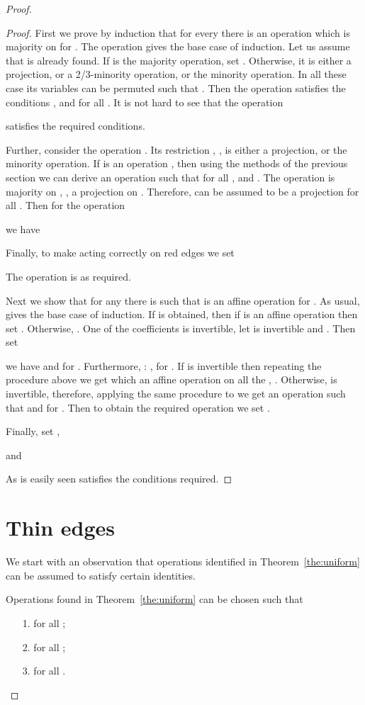 \documentclass[11pt]{article}
\begin{document}
\begin{proof}
\begin{proof}
First we prove by induction that for every  there is an
operation  which is majority on  for . The
operation  gives the base case of induction. Let us assume
that  is already found. If  is the majority
operation, set . Otherwise, it is either a projection, or
a 2/3-minority operation, or the minority operation. In all these case
its variables can be permuted such that
. Then the operation
 satisfies the conditions ,
and  for all . It is not hard to see that the
operation

satisfies the required conditions. 

Further, consider the operation . Its restriction ,
, is either a projection, or the minority operation. If
 is an operation , then using the
methods of the previous section we can derive
an operation  such that  for all , and . The operation 
is majority on , , a projection on . Therefore,
 can be assumed to be a projection for all . Then for the operation  

we have

Finally, to make  acting correctly on red edges we set 

The operation  is as required. 

Next we show that for any  there is  such that
 is an affine operation for . As usual,
 gives the base case of induction. If  is obtained,
then if  is an affine operation then set
. Otherwise, . One of
the coefficients is invertible, let  is invertible and
. Then set 

we have  and  for
. Furthermore, : ,
 for . If  is invertible then repeating the
procedure above we get  which an affine operation on all
the , . Otherwise,  is invertible, therefore,
applying the same procedure to  we get an operation
 such that  and  for
. Then to obtain the required operation we set
. 

Finally, set ,

and

As is easily seen  satisfies the conditions required.
\end{proof}


\section{Thin edges}\label{sec:thin}

We start with an observation that operations  identified in 
Theorem~\ref{the:uniform} can be assumed to satisfy certain identities.

\begin{lemma}\label{lem:fgh-identities}
Operations  found in Theorem~\ref{the:uniform} can be chosen such that
\begin{itemize}
\item[1.]
 for all ;
\item[2.]
 for all ;
\item[3.]
 for all .
\end{itemize}
\end{lemma}


\end{proof}
\end{document}
